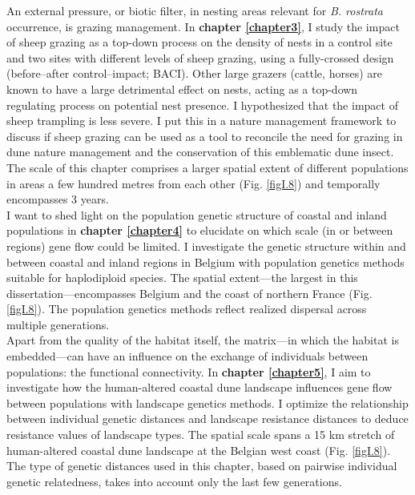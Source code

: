 \documentclass[10pt, twoside]{book} %
\begin{document}
	An external pressure, or biotic filter, in nesting areas relevant for \textit{B. rostrata} occurrence, is grazing management. In \textbf{chapter \ref{chapter3}}, I study the impact of sheep grazing as a top-down process on the density of nests in a control site and two sites with different levels of sheep grazing, using a fully-crossed design (before--after control--impact; BACI). Other large grazers (cattle, horses) are known to have a large detrimental effect on nests, acting as a top-down regulating process on potential nest presence. I hypothesized that the impact of sheep trampling is less severe. I put this in a nature management framework to discuss if sheep grazing can be used as a tool to reconcile the need for grazing in dune nature management and the conservation of this emblematic dune insect. The scale of this chapter comprises a larger spatial extent of different populations in areas a few hundred metres from each other (Fig. \ref{figI.8}) and temporally encompasses 3 years.\\
	
	I want to shed light on the population genetic structure of coastal and inland populations in \textbf{chapter \ref{chapter4}} to elucidate on which scale (in or between regions) gene flow could be limited. I investigate the genetic structure within and between coastal and inland regions in Belgium with population genetics methods suitable for haplodiploid species. The spatial extent---the largest in this dissertation---encompasses Belgium and the coast of northern France (Fig. \ref{figI.8}). The population genetics methods reflect realized dispersal across multiple generations.\\
	
	Apart from the quality of the habitat itself, the matrix---in which the habitat is embedded---can have an influence on the exchange of individuals between populations: the functional connectivity. In \textbf{chapter \ref{chapter5}}, I aim to investigate how the human-altered coastal dune landscape influences gene flow between populations with landscape genetics methods. I optimize the relationship between individual genetic distances and landscape resistance distances to deduce resistance values of landscape types. The spatial scale spans a 15 km stretch of human-altered coastal dune landscape at the Belgian west coast (Fig. \ref{figI.8}). The type of genetic distances used in this chapter, based on pairwise individual genetic relatedness, takes into account only the last few generations.\\
	
\end{document}
